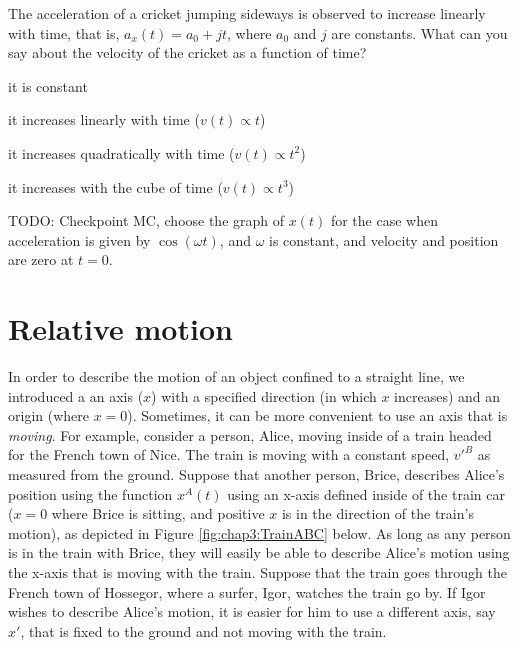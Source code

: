 \begin{checkpointMC}{The acceleration of a cricket jumping sideways is observed to increase linearly with time, that is, $a_x(t)=a_0+jt$, where $a_0$ and $j$ are constants. What can you say about the velocity of the cricket as a function of time?}
\item it is constant
\item it increases linearly with time ($v(t)\propto t$)
\item it increases quadratically with time ($v(t)\propto t^2$) %
\item it increases with the cube of time ($v(t)\propto t^3$)
\end{checkpointMC}

TODO: Checkpoint MC, choose the graph of $x(t)$ for the case when acceleration is given by $\cos(\omega t)$, and $\omega$ is constant, and velocity and position are zero at $t=0$.

\section{Relative motion}
In order to describe the motion of an object confined to a straight line, we introduced a an axis ($x$) with a specified direction (in which $x$ increases) and an origin (where $x=0$). Sometimes, it can be more convenient to use an axis that is \textit{moving}. For example, consider a person, Alice, moving inside of a train headed for the French town of Nice. The train is moving with a constant speed, $v'^B$ as measured from the ground. Suppose that another person, Brice, describes Alice's position using the function $x^A(t)$ using an x-axis defined inside of the train car ($x=0$ where Brice is sitting, and positive $x$ is in the direction of the train's motion), as depicted in Figure \ref{fig:chap3:TrainABC} below. As long as any person is in the train with Brice, they will easily be able to describe Alice's motion using the x-axis that is moving with the train. Suppose that the train goes through the French town of Hossegor, where a surfer, Igor, watches the train go by. If Igor wishes to describe Alice's motion, it is easier for him to use a different axis, say $x'$, that is fixed to the ground and not moving with the train. 

